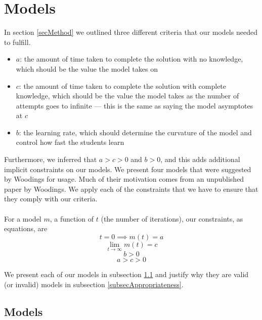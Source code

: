\section{Models} \label{secModels}

In section \ref{secMethod} we outlined three different criteria that our models
needed to fulfill.

\begin{itemize}
  \item $a$: the amount of time taken to complete the solution with no knowledge,
  which should be the value the model takes on \AZ
  \item $c$: the amount of time taken to complete the solution with complete
  knowledge, which should be the value the model takes as the number of attempts
  goes to infinite --- this is the same as saying the model asymptotes at $c$
  \item $b$: the learning rate, which should determine the curvature of the
  model and control how fast the students learn
\end{itemize}

Furthermore, we inferred that $a > c > 0$ and $b > 0$, and this adds additional
implicit constraints on our models.
We present four models that were suggested by Woodings for usage.
Much of their motivation comes from an unpublished paper by Woodings. \FIXME
We apply each of the constraints that we have to ensure that they comply with
our criteria.\\
\\
For a model $m$, a function of $t$ (the number of iterations), our constraints, as equations, are
\begin{equation} \label{conOne}
  t = 0 \implies m(t) = a
\end{equation}
\begin{equation} \label{conTwo}
  \lim_{t \to \infty} m(t) = c
\end{equation}
\begin{equation} \label{conThree}
  b > 0
\end{equation}
\begin{equation} \label{conFour}
  a > c > 0
\end{equation}

We present each of our models in subsection \ref{subsecModels} and justify why
they are valid (or invalid) models in subsection \ref{subsecAppropriateness}.

\subsection{Models} \label{subsecModels}

